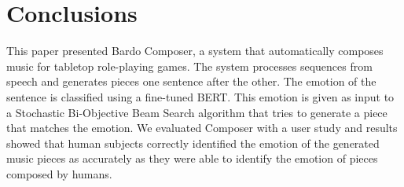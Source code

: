\section{Conclusions}

This paper presented Bardo Composer, a system that
automatically composes music for tabletop role-playing games. The system processes sequences
from speech and generates pieces one sentence after the other. The emotion of the sentence is classified using a fine-tuned BERT. This emotion is given as
input to a Stochastic Bi-Objective Beam Search algorithm that tries to generate a piece that matches the emotion.
We evaluated Composer with a user study and results showed that human subjects correctly identified the emotion of the generated music pieces as accurately as they were able to identify the emotion of pieces composed by humans.
